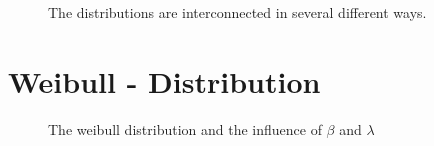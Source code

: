 \documentclass[
  a4paper,
]{scrbook}
\begin{document}
\begin{figure}[H]


\caption{\label{fig-interconnections}The distributions are
interconnected in several different ways.}

\end{figure}%

\section{Weibull - Distribution}\label{weibull---distribution}

\begin{figure}[ht]


\caption{\label{fig-wbll-dist}The weibull distribution and the influence
of \(\beta\) and \(\lambda\)}

\end{figure}%
\end{document}
